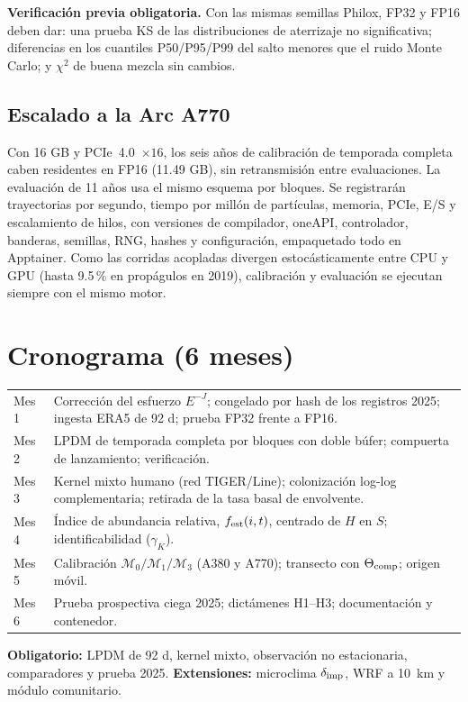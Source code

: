 \documentclass[11pt,letterpaper]{article}
\begin{document}
\textbf{Verificación previa obligatoria.} Con las mismas semillas Philox, FP32 y FP16 deben dar: una prueba KS de las distribuciones de aterrizaje no significativa; diferencias en los cuantiles P50/P95/P99 del salto menores que el ruido Monte Carlo; y $\chi^2$ de buena mezcla sin cambios.

\subsection{Escalado a la Arc A770}
Con 16 GB y PCIe~4.0~$\times16$, los seis años de calibración de temporada completa caben residentes en FP16 (11.49 GB), sin retransmisión entre evaluaciones. La evaluación de 11 años usa el mismo esquema por bloques. Se registrarán trayectorias por segundo, tiempo por millón de partículas, memoria, PCIe, E/S y escalamiento de hilos, con versiones de compilador, oneAPI, controlador, banderas, semillas, RNG, hashes y configuración, empaquetado todo en Apptainer. Como las corridas acopladas divergen estocásticamente entre CPU y GPU (hasta 9.5\,\% en propágulos en 2019), calibración y evaluación se ejecutan siempre con el mismo motor.

\section{Cronograma (6 meses)}
\begin{center}\small
\begin{tabularx}{\textwidth}{@{}p{1.3cm}Y@{}}\toprule
Mes 1 & Corrección del esfuerzo $E^{-J}$; congelado por hash de los registros 2025; ingesta ERA5 de 92 d; prueba FP32 frente a FP16.\\
Mes 2 & LPDM de temporada completa por bloques con doble búfer; compuerta de lanzamiento; verificación.\\
Mes 3 & Kernel mixto humano (red TIGER/Line); colonización log-log complementaria; retirada de la tasa basal de envolvente.\\
Mes 4 & Índice de abundancia relativa, $f_{\rm est}(i,t)$, centrado de $H$ en $S$; identificabilidad ($\gamma_K$).\\
Mes 5 & Calibración $\mathcal M_0/\mathcal M_1/\mathcal M_3$ (A380 y A770); transecto con $\Theta_{\rm comp}$; origen móvil.\\
Mes 6 & Prueba prospectiva ciega 2025; dictámenes H1--H3; documentación y contenedor.\\
\bottomrule\end{tabularx}\end{center}
\textbf{Obligatorio:} LPDM de 92 d, kernel mixto, observación no estacionaria, comparadores y prueba 2025. \textbf{Extensiones:} microclima $\delta_{\rm imp}$, WRF a 10~km y módulo comunitario.
\end{document}
